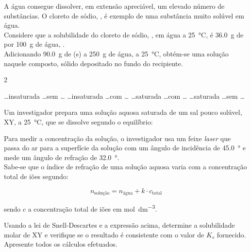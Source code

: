 \documentclass[addpoints]{exam}
\begin{document}
\begin{questions}
		\question[8] A água consegue dissolver, em extensão apreciável, um elevado número de substâncias. O cloreto de sódio, , é exemplo de uma substância muito solúvel em água.\\
		
		Considere que a solubilidade do cloreto de sódio, , em água a \SI{25}{\celsius}, é \SI{36,0}{\gram} de  por \SI{100}{\gram} de água, .\\
		Adicionando \SI{90,0}{\gram} de (s) a \SI{250}{\gram} de água, a \SI{25}{\celsius}, obtém-se uma solução \underline{\hspace{50pt}} naquele composto, \underline{\hspace{50pt}} sólido depositado no fundo do recipiente.
		
		\begin{multicols}{2}
			\begin{randomizechoices}
				\choice \ldots insaturada \ldots sem \ldots
				\choice \ldots insaturada \ldots com \ldots
				\choice \ldots saturada \ldots com \ldots
				\correctchoice \ldots saturada \ldots sem \ldots
			\end{randomizechoices}
		\end{multicols}
		
		
		\question[16] Um investigador prepara uma solução aquosa saturada de um sal pouco solúvel, XY, a \SI{25}{\celsius}, que se dissolve segundo o equilíbrio:\\
		
		\begin{center}
		\end{center}
		
		Para medir a concentração da solução, o investigador usa um feixe \textit{laser} que passa do ar para a superfície da solução com um ângulo de incidência de \SI{45,0}{\degree} e mede um ângulo de refração de \SI{32,0}{\degree}.\\
		
		Sabe-se que o índice de refração de uma	solução aquosa varia com a concentração total de iões segundo:
		
		\[
		n_{\text{solução}} = n_{\text{água}} + k \cdot c_\text{total}
		\]
		
		sendo $c$ a concentração total de iões em \unit{\mole\per\cubic\deci\meter}.
		
		Usando a lei de Snell-Descartes e a expressão acima, determine a solubilidade molar de XY e verifique se o resultado é consistente com o valor de $K_s$ fornecido.\\
		Apresente todos os cálculos efetuados.
		

\end{questions}
\end{document}

